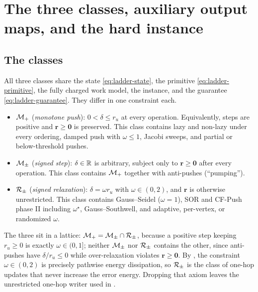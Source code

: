\section{The three classes, auxiliary output maps, and the hard instance}
\label{sec:ladder-classes}

\subsection*{The classes}

\begin{definition}
\label{def:ladder-classes}
All three classes share the state \eqref{eq:ladder-state}, the primitive
\eqref{eq:ladder-primitive}, the fully charged work model, the instance, and
the guarantee \eqref{eq:ladder-guarantee}. They differ in one constraint each.
\begin{itemize}[leftmargin=2.2em]
    \item $\mathcal{M}_{+}$ (\emph{monotone push}): $0<\delta\le r_u$ at every
        operation. Equivalently, steps are positive and
        $\bm{r}\ge\bm{0}$ is preserved. This class contains lazy and
        non-lazy \APPR{} under every ordering, damped push with
        $\omega\le1$, Jacobi sweeps, and partial or below-threshold pushes.
    \item $\mathcal{M}_{\pm}$ (\emph{signed step}): $\delta\in\mathbb{R}$ is arbitrary, subject
        only to $\bm{r}\ge\bm{0}$ after every operation. This class contains
        $\mathcal{M}_{+}$ together with anti-pushes (``pumping'').
    \item $\mathcal{R}_{\pm}$ (\emph{signed relaxation}): $\delta=\omega r_u$ with
        $\omega\in(0,2)$, and $\bm{r}$ is otherwise unrestricted. This class
        contains Gauss--Seidel ($\omega=1$), SOR and CF-Push phase II including
        $\omega^{\star}$, Gauss--Southwell, and adaptive, per-vertex, or
        randomized $\omega$.
\end{itemize}
\end{definition}

The three sit in a lattice: $\mathcal{M}_{+}=\mathcal{M}_{\pm}\cap\mathcal{R}_{\pm}$, because a positive step
keeping $r_u\ge0$ is exactly $\omega\in(0,1]$; neither $\mathcal{M}_{\pm}$ nor $\mathcal{R}_{\pm}$
contains the other, since anti-pushes have $\delta/r_u\le0$ while
over-relaxation violates $\bm{r}\ge\bm{0}$. By
, the constraint $\omega\in(0,2)$ is precisely
pathwise energy dissipation, so $\mathcal{R}_{\pm}$ is the class of one-hop updates that
never increase the error energy. Dropping that axiom leaves the unrestricted
one-hop writer used in .

